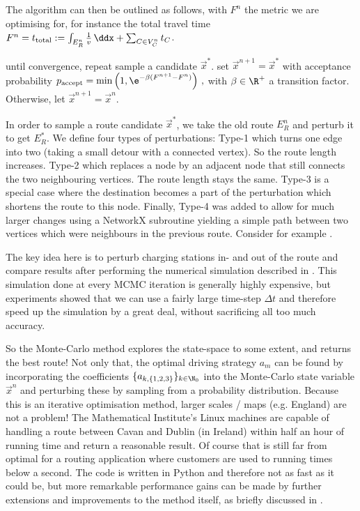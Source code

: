 \documentclass{prettytex/ox/mmsc-special-topic}
\begin{document}
  The algorithm can then be outlined as follows, with $F^{n}$ the metric we are optimising for, for instance the total travel time $F^n = t_{\rm total} := \int_{E_R^n} \frac{1}{v} \,\ddx + \sum_{C \in V_C^n} t_C$.
  \begin{algorithm}[language=pseudo,caption={\centering The Metropolis-Hastings algorithm \parencite{metropolis, hastings}},basicstyle=\footnotesize]
until convergence, repeat
  sample a candidate $\vec{x}^*$.
  set $\vec{x}^{n+1} = \vec{x}^*$ with acceptance probability
    $p_{\rm accept} = \min\left(1, \e^{-\beta (F^{n+1} - F^n)}\right)\,,$ with $\beta \in \R^+$ a transition factor.
  Otherwise, let $\vec{x}^{n+1} = \vec{x}^{n}$.
  \end{algorithm}

  In order to sample a route candidate $\vec{x}^*$, we take the old route $E_R^n$ and perturb it to get $E_R^*$.
  We define four types of perturbations: Type-1 which turns one edge into two (taking a small detour with a connected vertex). So the route length increases.
  Type-2 which replaces a node by an adjacent node that still connects the two neighbouring vertices. The route length stays the same.
  Type-3 is a special case where the destination becomes a part of the perturbation which shortens the route to this node.
  Finally, Type-4 was added to allow for much larger changes using a NetworkX subroutine yielding a simple path between two vertices which were neighbours in the previous route. Consider for example .

  The key idea here is to perturb charging stations in- and out of the route and compare results after performing the numerical simulation described in .
  This simulation done at every MCMC iteration is generally highly expensive, but experiments showed that we can use a fairly large time-step $\Delta t$ and therefore speed up the simulation by a great deal, without sacrificing all too much accuracy.

  So the Monte-Carlo method explores the state-space to some extent, and returns the best route!
  Not only that, the optimal driving strategy $a_m$ can be found by incorporating the coefficients $\{a_{k,\{1,2,3\}}\}_{k\in\N_0}$ into the Monte-Carlo state variable $\vec{x}^{n}$ and perturbing these by sampling from a probability distribution.
  Because this is an iterative optimisation method, larger scales / maps (e.g. England) are not a problem! The Mathematical Institute's Linux machines are capable of handling a route between Cavan and Dublin (in Ireland) within half an hour of running time and return a reasonable result.
  Of course that is still far from optimal for a routing application where customers are used to running times below a second.
  The code is written in Python and therefore not as fast as it could be, but more remarkable performance gains can be made by further extensions and improvements to the method itself, as briefly discussed in .
\end{document}
